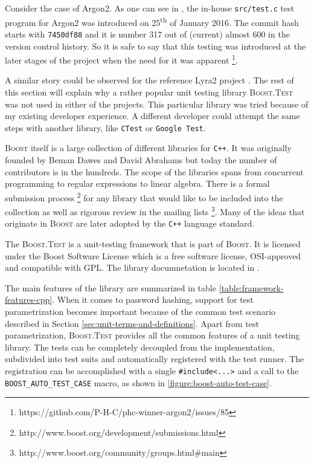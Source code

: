 Consider the case of Argon2. As one can see in \cite{github:2017:argon2}, the in-house \texttt{src/test.c} test program for Argon2 was introduced on 25\textsuperscript{th} of January 2016. The commit hash starts with \texttt{7450df88} and it is number 317 out of (current) almost 600 in the version control history. So it is safe to say that this testing was introduced at the later stages of the project when the need for it was apparent \footnote{https://github.com/P-H-C/phc-winner-argon2/issues/85}.

A similar story could be observed for the reference Lyra2 project \cite{github:2017:lyra}. The rest of this section will explain why a rather popular unit testing library \textsc{Boost.Test} was not used in either of the projects. This particular library was tried because of my existing developer experience. A different developer could attempt the same steps with another library, like \texttt{CTest} or \texttt{Google Test}.

\textsc{Boost} itself is a large collection of different libraries for \texttt{C++}. It was originally founded by Beman Dawes and David Abrahams but today the number of contributors is in the hundreds. The scope of the libraries spans from concurrent programming to regular expressions to linear algebra. There is a formal submission process \footnote{http://www.boost.org/development/submissions.html} for any library that would like to be included into the collection as well as rigorous review in the mailing lists \footnote{http://www.boost.org/community/groups.html\#main}. Many of the ideas that originate in \textsc{Boost} are later adopted by the \texttt{C++} language standard.

The \textsc{Boost.Test} is a unit-testing framework that is part of \textsc{Boost}. It is licensed under the Boost Software License which is a free software license, OSI-approved and compatible with GPL. The library documnetation is located in \cite{boost:2017:test-docs}.

The main features of the library are summarized in table \ref{table:framework-features-cpp}. When it comes to password hashing, support for test parametrization becomes important because of the common test scenario described in Section \ref{sec:unit-terms-and-definitions}. Apart from test parametrization, \textsc{Boost.Test} provides all the common features of a unit testing library. The tests can be completely decoupled from the implementation, subdivided  into test suits and automatically registered with the test runner. The registration can be accomplished with a single \texttt{#include<...>} and a call to the \texttt{BOOST_AUTO_TEST_CASE} macro, as shown in \ref{figure:boost-auto-test-case}.

